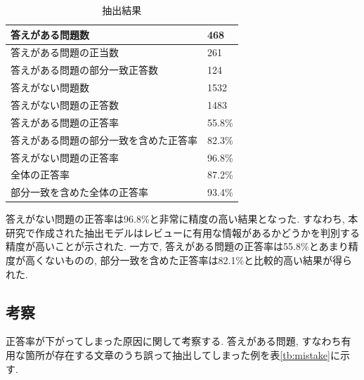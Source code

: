 \begin{table}[H]
  \caption{抽出結果}
  \small
  \label{tb:qa}
  \begin{center}
  \begin{tabularx}{\linewidth}{X|X}
    \hline
    答えがある問題数&468\\\hline
    答えがある問題の正当数&261\\\hline
    答えがある問題の部分一致正答数&124\\\hline
    答えがない問題数&1532\\\hline
    答えがない問題の正答数&1483\\\hline\hline
    答えがある問題の正答率&55.8\%\\\hline
    答えがある問題の部分一致を含めた正答率&82.3\%\\\hline
    答えがない問題の正答率&96.8\%\\\hline\hline
    全体の正答率&87.2\%\\\hline
    部分一致を含めた全体の正答率&93.4\%\\\hline
  \end{tabularx}\end{center}
\end{table}

答えがない問題の正答率は96.8\%と非常に精度の高い結果となった. すなわち, 本研究で作成された抽出モデルはレビューに有用な情報があるかどうかを判別する精度が高いことが示された. 
一方で, 答えがある問題の正答率は55.8\%とあまり精度が高くないものの, 部分一致を含めた正答率は82.1\%と比較的高い結果が得られた. 

\subsection{考察}
正答率が下がってしまった原因に関して考察する. 
答えがある問題, すなわち有用な箇所が存在する文章のうち誤って抽出してしまった例を表\ref{tb:mistake}に示す.

